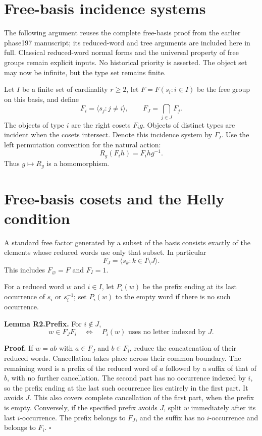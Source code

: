 \section{Free-basis incidence
systems}\label{free-basis-incidence-systems}

The following argument reuses the complete free-basis proof from the
earlier phase197 manuscript; its reduced-word and tree arguments are
included here in full. Classical reduced-word normal forms and the
universal property of free groups remain explicit inputs. No historical
priority is asserted. The object set may now be infinite, but the type
set remains finite.

Let \(I\) be a finite set of cardinality \(r\ge2\), let
\(F=F(s_i:i\in I)\) be the free group on this basis, and define \[
F_i=\langle s_j:j\ne i\rangle,
\qquad F_J=\bigcap_{j\in J}F_j.
\] The objects of type \(i\) are the right cosets \(F_i g\). Objects of
distinct types are incident when the cosets intersect. Denote this
incidence system by \(\Gamma_I\). Use the left permutation convention
for the natural action: \[
R_g(F_i h)=F_i h g^{-1}.
\tag{F1}
\] Thus \(g\mapsto R_g\) is a homomorphism.

\section{Free-basis cosets and the Helly
condition}\label{free-basis-cosets-and-the-helly-condition}

A standard free factor generated by a subset of the basis consists
exactly of the elements whose reduced words use only that subset. In
particular \[
F_J=\langle s_k:k\in I\setminus J\rangle.
\tag{F2}
\] This includes \(F_\varnothing=F\) and \(F_I=1\).

For a reduced word \(w\) and \(i\in I\), let \(P_i(w)\) be the prefix
ending at its last occurrence of \(s_i\) or \(s_i^{-1}\); set \(P_i(w)\)
to the empty word if there is no such occurrence.

\textbf{Lemma R2.Prefix.} For \(i\notin J\), \[
w\in F_JF_i
\quad\Longleftrightarrow\quad
P_i(w)\text{ uses no letter indexed by }J.
\tag{F3}
\]

\textbf{Proof.} If \(w=ab\) with \(a\in F_J\) and \(b\in F_i\), reduce
the concatenation of their reduced words. Cancellation takes place
across their common boundary. The remaining word is a prefix of the
reduced word of \(a\) followed by a suffix of that of \(b\), with no
further cancellation. The second part has no occurrence indexed by
\(i\), so the prefix ending at the last such occurrence lies entirely in
the first part. It avoids \(J\). This also covers complete cancellation
of the first part, when the prefix is empty. Conversely, if the
specified prefix avoids \(J\), split \(w\) immediately after its last
\(i\)-occurrence. The prefix belongs to \(F_J\), and the suffix has no
\(i\)-occurrence and belongs to \(F_i\). \(\square\)

